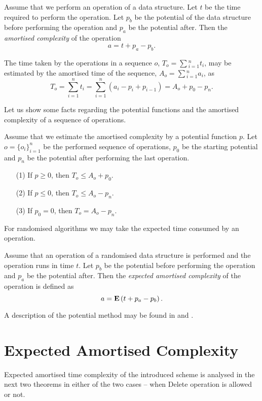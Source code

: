 \begin{definition}
Assume that we perform an operation of a data structure. Let $t$ be the time required to perform the operation. Let $p_b$ be the potential of the data structure before performing the operation and $p_a$ be the potential after. Then the \emph{amortised complexity} of the operation \[ a = t + p_a - p_b \text{.} \]
\end{definition}

The time taken by the operations in a sequence $o$, $T_o = \sum\displaystyle_{i = 1}^{n} t_i$, may be estimated by the amortised time of the sequence, $A_o = \sum\displaystyle_{i = 1}^{n} a_i$, as
\[
	T_o = \displaystyle\sum_{i = 1}^{n} t_i = \displaystyle\sum_{i = 1}^{n} (a_i - p_i + p_{i - 1}) = A_o + p_0 - p_n \text{.}
\]

Let us show some facts regarding the potential functions and the amortised complexity of a sequence of operations.
\begin{claim}
\label{claim-amortised-complexity}
Assume that we estimate the amortised complexity by a potential function $p$. Let $o = \{o_i\}_{i = 1}^{n}$ be the performed sequence of operations, $p_0$ be the starting potential and $p_n$ be the potential after performing the last operation.
\begin{enumerate}
\item [(1)] If $p \geq 0$, then $T_o \leq A_o + p_0$.
\item [(2)] If $p \leq 0$, then $T_o \leq A_o - p_n$.
\item [(3)] If $p_0 = 0$, then $T_o = A_o - p_n$.
\end{enumerate}
\end{claim}

For randomised algorithms we may take the expected time consumed by an operation.

\begin{definition}
Assume that an operation of a randomised data structure is performed and the operation runs in time $t$. Let $p_b$ be the potential before performing the operation and $p_a$ be the potential after. Then the \emph{expected amortised complexity} of the operation is defined as \[ a = \mathbf{E}\left(t + p_a - p_{b}\right) \text{.} \]
\end{definition}

A description of the potential method may be found in \cite{VK-skripta} and \cite{DBLP:books/sp/MehlhornS2008}.

\section{Expected Amortised Complexity}
\label{section-expected-amortised-complexity}
Expected amortised time complexity of the introduced scheme is analysed in the next two theorems in either of the two cases -- when Delete operation is allowed or not.

